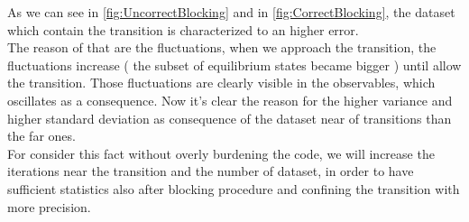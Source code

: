             \noindent
            As we can see in \cref{fig:UncorrectBlocking} and in \cref{fig:CorrectBlocking}, the dataset which contain the transition is characterized to an higher
            error.\\
            \noindent 
            The reason of that are the fluctuations, when we approach the transition, the fluctuations increase ( the subset of equilibrium states became bigger ) until 
            allow the transition. Those fluctuations are clearly visible in the observables, which oscillates as a consequence. Now it's clear the reason
            for the higher variance and higher standard deviation as consequence of the dataset near of transitions than the far ones. \\
            \noindent
            For consider this fact without overly burdening the code, we will increase the iterations near the transition and the number of dataset,
            in order to have sufficient statistics also after blocking procedure and confining the transition with more precision.

